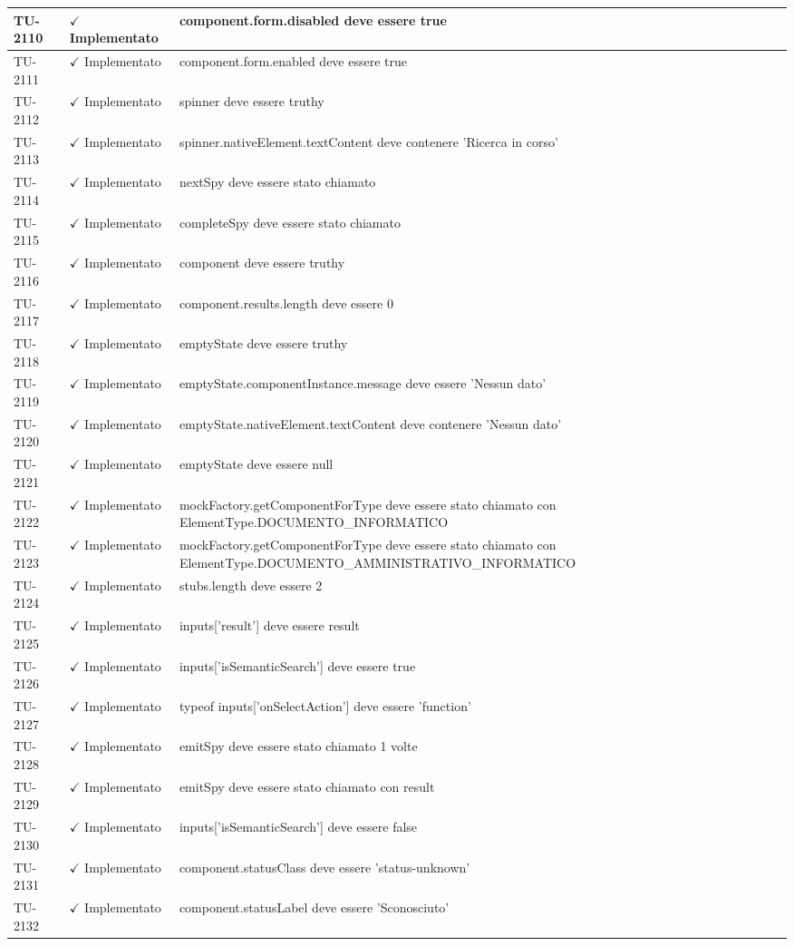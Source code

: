 ﻿\documentclass[a4paper,12pt]{article}
\newcommand{\ok}{\textcolor{green!60!black}{$\checkmark$ Implementato}}
\begin{document}
\begin{longtable}{|p{2cm}|p{3.5cm}|p{9.5cm}|}
\hline
TU-2110 & \ok & component.form.disabled deve essere true \\
\hline
TU-2111 & \ok & component.form.enabled deve essere true \\
\hline
TU-2112 & \ok & spinner deve essere truthy \\
\hline
TU-2113 & \ok & spinner.nativeElement.textContent deve contenere 'Ricerca in corso' \\
\hline
TU-2114 & \ok & nextSpy deve essere stato chiamato \\
\hline
TU-2115 & \ok & completeSpy deve essere stato chiamato \\
\hline
TU-2116 & \ok & component deve essere truthy \\
\hline
TU-2117 & \ok & component.results.length deve essere 0 \\
\hline
TU-2118 & \ok & emptyState deve essere truthy \\
\hline
TU-2119 & \ok & emptyState.componentInstance.message deve essere 'Nessun dato' \\
\hline
TU-2120 & \ok & emptyState.nativeElement.textContent deve contenere 'Nessun dato' \\
\hline
TU-2121 & \ok & emptyState deve essere null \\
\hline
TU-2122 & \ok & mockFactory.getComponentForType deve essere stato chiamato con ElementType.DOCUMENTO\_INFORMATICO \\
\hline
TU-2123 & \ok & mockFactory.getComponentForType deve essere stato chiamato con ElementType.DOCUMENTO\_AMMINISTRATIVO\_INFORMATICO \\
\hline
TU-2124 & \ok & stubs.length deve essere 2 \\
\hline
TU-2125 & \ok & inputs['result'] deve essere result \\
\hline
TU-2126 & \ok & inputs['isSemanticSearch'] deve essere true \\
\hline
TU-2127 & \ok & typeof inputs['onSelectAction'] deve essere 'function' \\
\hline
TU-2128 & \ok & emitSpy deve essere stato chiamato 1 volte \\
\hline
TU-2129 & \ok & emitSpy deve essere stato chiamato con result \\
\hline
TU-2130 & \ok & inputs['isSemanticSearch'] deve essere false \\
\hline
TU-2131 & \ok & component.statusClass deve essere 'status-unknown' \\
\hline
TU-2132 & \ok & component.statusLabel deve essere 'Sconosciuto' \\

\end{longtable}
\end{document}
